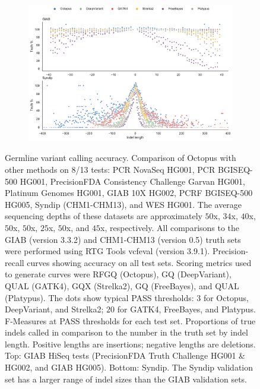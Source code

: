 \documentclass[notitlepage, twocolumn, 10pt]{article}
\begin{document}
\begin{figure}[ht!]
\begin{subfigure}[b]{0.49\textwidth}
        \includegraphics[width=\textwidth]{figures/germline_indels}
        \label{fig:germline:indels}
    \end{subfigure}
    \vspace{-0.5cm}
    \caption{Germline variant calling accuracy. Comparison of Octopus with other methods on 8/13 tests: PCR NovaSeq HG001, PCR BGISEQ-500 HG001, PrecisionFDA Consistency Challenge Garvan HG001, Platinum Genomes HG001, GIAB 10X HG002, PCRF BGISEQ-500 HG005, Syndip (CHM1-CHM13), and WES HG001. The average sequencing depths of these datasets are approximately $50$x, $34$x, $40$x, $50$x, $50$x, $25$x, $50$x, and $45$x, respectively. All comparisons to the GIAB (version 3.3.2) and CHM1-CHM13 (version 0.5) truth sets were performed using RTG Tools vcfeval (version 3.9.1). \protect{} Precision-recall curves showing accuracy on all test sets. Scoring metrics used to generate curves were RFGQ (Octopus), GQ (DeepVariant), QUAL (GATK4), GQX (Strelka2), GQ (FreeBayes), and QUAL (Platypus). The dots show typical PASS thresholds: $3$ for Octopus, DeepVariant, and Strelka2; $20$ for GATK4, FreeBayes, and Platypus. \protect{} F-Measures at PASS thresholds for each test set. \protect{} Proportions of true indels called in comparison to the number in the truth set by indel length. Positive lengths are insertions; negative lengths are deletions. Top: GIAB HiSeq tests (PrecisionFDA Truth Challenge HG001 \& HG002, and GIAB HG005). Bottom: Syndip. The Syndip validation set has a larger range of indel sizes than the GIAB validation sets.}
    \label{fig:germline}
\end{figure}
\end{document}
